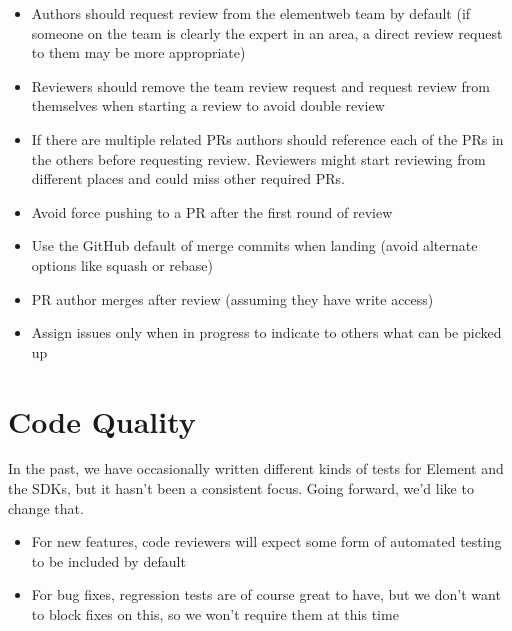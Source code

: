 \documentclass[letterpaper,10pt,openany,oneside,english]{sphinxmanual}
\begin{document}
\begin{itemize}
\item {} 
\sphinxAtStartPar
Authors should request review from the element\sphinxhyphen{}web team by default (if someone on
the team is clearly the expert in an area, a direct review request to them may
be more appropriate)

\item {} 
\sphinxAtStartPar
Reviewers should remove the team review request and request review from
themselves when starting a review to avoid double review

\item {} 
\sphinxAtStartPar
If there are multiple related PRs authors should reference each of the PRs in
the others before requesting review. Reviewers might start reviewing from
different places and could miss other required PRs.

\item {} 
\sphinxAtStartPar
Avoid force pushing to a PR after the first round of review

\item {} 
\sphinxAtStartPar
Use the GitHub default of merge commits when landing (avoid alternate options
like squash or rebase)

\item {} 
\sphinxAtStartPar
PR author merges after review (assuming they have write access)

\item {} 
\sphinxAtStartPar
Assign issues only when in progress to indicate to others what can be picked
up

\end{itemize}


\chapter{Code Quality}
\label{\detokenize{review:code-quality}}
\sphinxAtStartPar
In the past, we have occasionally written different kinds of tests for
Element and the SDKs, but it hasn’t been a consistent focus. Going forward, we’d
like to change that.
\begin{itemize}
\item {} 
\sphinxAtStartPar
For new features, code reviewers will expect some form of automated testing to
be included by default

\item {} 
\sphinxAtStartPar
For bug fixes, regression tests are of course great to have, but we don’t want
to block fixes on this, so we won’t require them at this time

\end{itemize}
\end{document}
